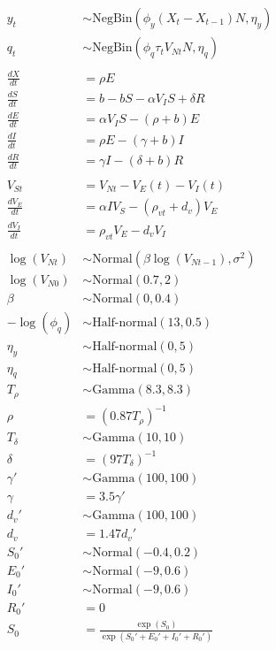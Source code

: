 \documentclass[10pt,letterpaper]{article}
\begin{document}
\begin{align}
y_t & \sim \text{NegBin}(\phi_y  (X_t - X_{t-1})N, \eta_y)\\
q_t & \sim \text{NegBin}(\phi_q \tau_t V_{Nt}N, \eta_q)\\
\\ 
\frac{dX}{dt} &= \rho E \\
\frac{dS}{dt} &= b - bS - \alpha V_{I} S + \delta R\\
\frac{dE}{dt} &= \alpha V_{I}S - (\rho + b)E\\
\frac{dI}{dt} &= \rho E - (\gamma + b)I\\
\frac{dR}{dt} &= \gamma I - (\delta + b)R\\
\\
V_{St} & = V_{Nt} - V_E(t) - V_I(t)\\
\frac{dV_E}{dt} &= \alpha I V_S - (\rho_{vt} + d_v)V_E\\
\frac{dV_I}{dt} &= \rho_{vt} V_E - d_v V_I\\
\\
\log(V_{Nt}) & \sim \text{Normal}(\beta \log(V_{Nt-1}), \sigma^2)\\
\log(V_{N0}) & \sim \text{Normal}(0.7, 2)\\
\beta & \sim \text{Normal}(0, 0.4)\\
-\log(\phi_q) & \sim \text{Half-normal}(13, 0.5)\\
\eta_y &\sim \text{Half-normal}(0, 5)\\
\eta_q & \sim \text{Half-normal}(0, 5)\\
T_{\rho} & \sim \text{Gamma}(8.3, 8.3)\\
\rho & = (0.87 T_{\rho})^{-1}\\
T_{\delta} & \sim \text{Gamma}(10, 10)\\
\delta & = (97 T_{\delta})^{-1}\\
\gamma' & \sim \text{Gamma}(100, 100)\\
\gamma & = 3.5\gamma'\\
d_{v}' & \sim \text{Gamma}(100, 100)\\
d_v & = 1.47 d_v'\\
S_0' & \sim \text{Normal}(-0.4, 0.2)\\
E_0' & \sim \text{Normal}(-9, 0.6)\\
I_0' & \sim \text{Normal}(-9, 0.6)\\
R_0' & = 0\\
S_0 & = \frac{\exp(S_0)}{\exp(S_0' + E_0' + I_0' + R_0')} \\
\end{align}
\end{document}
